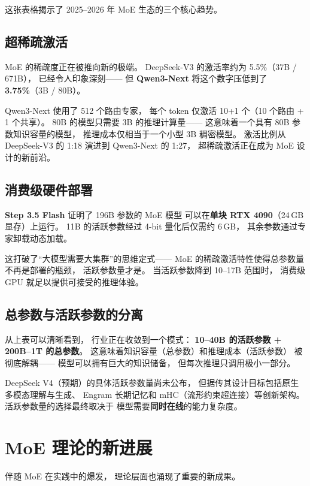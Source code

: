 这张表格揭示了 2025--2026 年 MoE 生态的三个核心趋势。

\subsection{超稀疏激活}

MoE 的稀疏度正在被推向新的极端。
DeepSeek-V3 的激活率约为 5.5\%（37B / 671B），
已经令人印象深刻——
但 \textbf{Qwen3-Next} 将这个数字压低到了
\textbf{3.75\%}（3B / 80B）。

Qwen3-Next 使用了 512 个路由专家，
每个 token 仅激活 10+1 个（10 个路由 + 1 个共享）。
80B 的模型只需要 3B 的推理计算量——
这意味着一个具有 80B 参数知识容量的模型，
推理成本仅相当于一个小型 3B 稠密模型。
激活比例从 DeepSeek-V3 的 1:18 演进到 Qwen3-Next 的 1:27，
超稀疏激活正在成为 MoE 设计的新前沿。

\subsection{消费级硬件部署}

\textbf{Step 3.5 Flash} 证明了 196B 参数的 MoE 模型
可以在\textbf{单块 RTX 4090}（24\,GB 显存）上运行。
11B 的活跃参数经过 4-bit 量化后仅需约 6\,GB，
其余参数通过专家卸载动态加载。

这打破了``大模型需要大集群''的思维定式——
MoE 的稀疏激活特性使得总参数量不再是部署的瓶颈，
活跃参数量才是。
当活跃参数降到 10--17B 范围时，
消费级 GPU 就足以提供可接受的推理体验。

\subsection{总参数与活跃参数的分离}

从上表可以清晰看到，
行业正在收敛到一个模式：
\textbf{10--40B 的活跃参数 + 200B--1T 的总参数}。
这意味着知识容量（总参数）和推理成本（活跃参数）
被彻底解耦——
模型可以拥有巨大的知识储备，
但每次推理只调用极小一部分。

DeepSeek V4（预期）的具体活跃参数量尚未公布，
但据传其设计目标包括原生多模态理解与生成、
Engram 长期记忆和 mHC（流形约束超连接）等创新架构。
活跃参数量的选择最终取决于
模型需要\textbf{同时在线}的能力复杂度。

\section{MoE 理论的新进展}
\label{sec:moe-theory-2026}

伴随 MoE 在实践中的爆发，
理论层面也涌现了重要的新成果。

